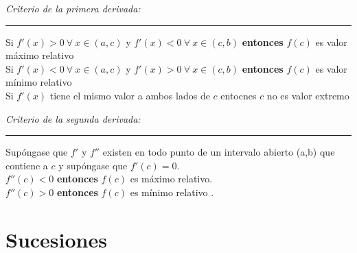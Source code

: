 \documentclass[12pt,a4paper]{extarticle}
\begin{document}
\begin{minipage}{16cm}
\begin{center}
\emph{Criterio de la primera derivada:}
\end{center}
\hrule
\vspace{1cm}
Si \(f'(x)>0 \ \forall \ x \in (a,c)\) y \(f'(x)<0 \ \forall \ x \in
(c,b)\) \textbf{entonces} \(f(c)\) es valor m\'aximo relativo \\[1em]
Si \(f'(x)<0 \ \forall \ x \in (a,c)\) y \(f'(x)>0 \ \forall \ x \in
(c,b)\) \textbf{entonces} \(f(c)\) es valor m\'inimo relativo \\[1em]
Si \(f'(x)\) tiene el mismo valor a ambos lados de \(c\) entocnes \(c\) no es
valor extremo\\
\vspace{0.5em}
\end{minipage}
\vspace{2em}

\begin{minipage}{16cm}
\begin{center}
\emph{Criterio de la segunda derivada:}
\end{center}
\hrule
\vspace{1em}
Sup\'ongase que \(f'\) y \(f''\) existen en todo punto de un intervalo
abierto (a,b) que contiene a \(c\) y sup\'ongase que \(f'(c)=0\).\\[1em]
\(f''(c) < 0\) \textbf{entonces} \(f(c)\) es m\'aximo relativo. \\[1em]
\(f''(c) > 0\) \textbf{entonces} \(f(c)\) es m\'inimo relativo .\\[1em]
\end{minipage}
\section{Sucesiones}
\end{document}
